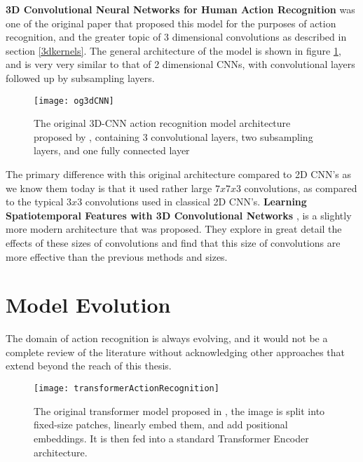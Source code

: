 \textbf{3D Convolutional Neural Networks for Human Action Recognition} \cite{3DCNN-ActionRecognition} was one of the original paper that proposed this model for the purposes of action recognition, and the greater topic of 3 dimensional convolutions as described in section \ref{3dkernels}. The general architecture of the model is shown in figure \ref{fig:original3dcnn}, and is very very similar to that of 2 dimensional CNNs, with convolutional layers followed up by subsampling layers.

\begin{figure}[h]
	\texttt{[image: og3dCNN]}
	\centering
	\caption{The original 3D-CNN action recognition model architecture proposed by \cite{3DCNN-ActionRecognition}, containing 3 convolutional layers, two subsampling layers, and one fully connected layer}
	\label{fig:original3dcnn}
\end{figure}

The primary difference with this original architecture compared to 2D CNN's as we know them today is that it used rather large $7x7x3$ convolutions, as compared to the typical $3x3$ convolutions used in classical 2D CNN's. \textbf{Learning Spatiotemporal Features with 3D Convolutional Networks} \cite{3x33dcnn}, is a slightly more modern architecture that was proposed. They explore in great detail the effects of these sizes of convolutions and find that this size of convolutions are more effective than the previous methods and sizes.

\section{Model Evolution}

The domain of action recognition is always evolving, and it would not be a complete review of the literature without acknowledging other approaches that extend beyond the reach of this thesis.

\begin{figure}[h]
	\texttt{[image: transformerActionRecognition]}
	\centering
	\caption{The original transformer model proposed in \cite{transformer_og}, the image is split into fixed-size patches, linearly embed them, and add positional embeddings. It is then fed into a standard Transformer Encoder architecture.}
	\label{fig:transformerActionRecognition}
\end{figure}

